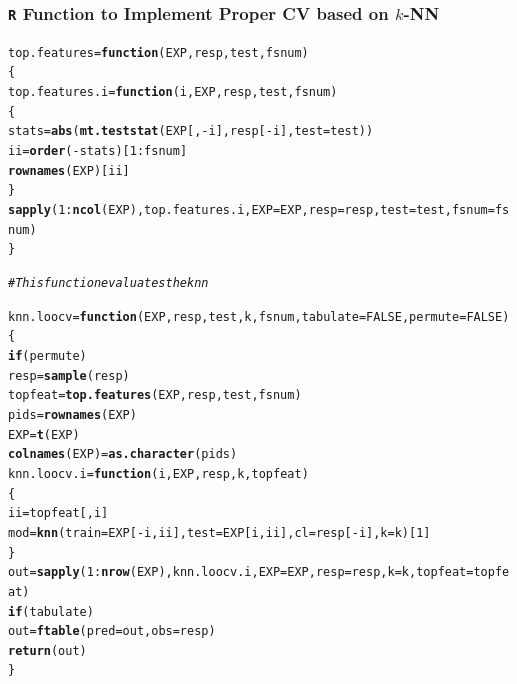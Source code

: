 \documentclass[xcolor=x11names,compress]{beamer}\usepackage[]{graphicx}\usepackage[]{color}
\makeatletter
\newcommand{\hlnum}[1]{\textcolor[rgb]{0.686,0.059,0.569}{#1}}%
\newcommand{\hlcom}[1]{\textcolor[rgb]{0.678,0.584,0.686}{\textit{#1}}}%
\newcommand{\hlopt}[1]{\textcolor[rgb]{0,0,0}{#1}}%
\newcommand{\hlstd}[1]{\textcolor[rgb]{0.345,0.345,0.345}{#1}}%
\newcommand{\hlkwa}[1]{\textcolor[rgb]{0.161,0.373,0.58}{\textbf{#1}}}%
\newcommand{\hlkwb}[1]{\textcolor[rgb]{0.69,0.353,0.396}{#1}}%
\newcommand{\hlkwc}[1]{\textcolor[rgb]{0.333,0.667,0.333}{#1}}%
\newcommand{\hlkwd}[1]{\textcolor[rgb]{0.737,0.353,0.396}{\textbf{#1}}}%
\newenvironment{kframe}{%
 \def\at@end@of@kframe{}%
 \ifinner\ifhmode%
  \def\at@end@of@kframe{\end{minipage}}%
  \begin{minipage}{\columnwidth}%
 \fi\fi%
 \def\FrameCommand##1{\hskip\@totalleftmargin \hskip-\fboxsep
 \colorbox{shadecolor}{##1}\hskip-\fboxsep
     \hskip-\linewidth \hskip-\@totalleftmargin \hskip\columnwidth}%
 \MakeFramed {\advance\hsize-\width
   \@totalleftmargin\z@ \linewidth\hsize
   \@setminipage}}%
 {\par\unskip\endMakeFramed%
 \at@end@of@kframe}
\newenvironment{knitrout}{}{} %
\makeatother
\begin{document}
\begin{frame}[containsverbatim]
  \frametitle{{\tt R} Function to Implement Proper CV based on $k$-NN}
\tiny
\begin{knitrout}\tiny
{}\color{fgcolor}\begin{kframe}
\begin{alltt}
\hlstd{top.features}\hlkwb{=}\hlkwa{function}\hlstd{(}\hlkwc{EXP}\hlstd{,}\hlkwc{resp}\hlstd{,}\hlkwc{test}\hlstd{,}\hlkwc{fsnum}\hlstd{)}
  \hlstd{\{}
    \hlstd{top.features.i}\hlkwb{=}\hlkwa{function}\hlstd{(}\hlkwc{i}\hlstd{,}\hlkwc{EXP}\hlstd{,}\hlkwc{resp}\hlstd{,}\hlkwc{test}\hlstd{,}\hlkwc{fsnum}\hlstd{)}
      \hlstd{\{}
        \hlstd{stats}\hlkwb{=}\hlkwd{abs}\hlstd{(}\hlkwd{mt.teststat}\hlstd{(EXP[,}\hlopt{-}\hlstd{i],resp[}\hlopt{-}\hlstd{i],}\hlkwc{test}\hlstd{=test))}
        \hlstd{ii}\hlkwb{=}\hlkwd{order}\hlstd{(}\hlopt{-}\hlstd{stats)[}\hlnum{1}\hlopt{:}\hlstd{fsnum]}
        \hlkwd{rownames}\hlstd{(EXP)[ii]}
      \hlstd{\}}
    \hlkwd{sapply}\hlstd{(}\hlnum{1}\hlopt{:}\hlkwd{ncol}\hlstd{(EXP),top.features.i,}\hlkwc{EXP}\hlstd{=EXP,}\hlkwc{resp}\hlstd{=resp,}\hlkwc{test}\hlstd{=test,}\hlkwc{fsnum}\hlstd{=fsnum)}
  \hlstd{\}}


\hlcom{# This function evaluates the knn}

\hlstd{knn.loocv}\hlkwb{=}\hlkwa{function}\hlstd{(}\hlkwc{EXP}\hlstd{,}\hlkwc{resp}\hlstd{,}\hlkwc{test}\hlstd{,}\hlkwc{k}\hlstd{,}\hlkwc{fsnum}\hlstd{,}\hlkwc{tabulate}\hlstd{=}\hlnum{FALSE}\hlstd{,}\hlkwc{permute}\hlstd{=}\hlnum{FALSE}\hlstd{)}
  \hlstd{\{}
    \hlkwa{if}\hlstd{(permute)}
      \hlstd{resp}\hlkwb{=}\hlkwd{sample}\hlstd{(resp)}
    \hlstd{topfeat}\hlkwb{=}\hlkwd{top.features}\hlstd{(EXP,resp,test,fsnum)}
    \hlstd{pids}\hlkwb{=}\hlkwd{rownames}\hlstd{(EXP)}
    \hlstd{EXP}\hlkwb{=}\hlkwd{t}\hlstd{(EXP)}
    \hlkwd{colnames}\hlstd{(EXP)}\hlkwb{=}\hlkwd{as.character}\hlstd{(pids)}
    \hlstd{knn.loocv.i}\hlkwb{=}\hlkwa{function}\hlstd{(}\hlkwc{i}\hlstd{,}\hlkwc{EXP}\hlstd{,}\hlkwc{resp}\hlstd{,}\hlkwc{k}\hlstd{,}\hlkwc{topfeat}\hlstd{)}
      \hlstd{\{}
        \hlstd{ii}\hlkwb{=}\hlstd{topfeat[,i]}
        \hlstd{mod}\hlkwb{=}\hlkwd{knn}\hlstd{(}\hlkwc{train}\hlstd{=EXP[}\hlopt{-}\hlstd{i,ii],}\hlkwc{test}\hlstd{=EXP[i,ii],}\hlkwc{cl}\hlstd{=resp[}\hlopt{-}\hlstd{i],}\hlkwc{k}\hlstd{=k)[}\hlnum{1}\hlstd{]}
      \hlstd{\}}
    \hlstd{out}\hlkwb{=}\hlkwd{sapply}\hlstd{(}\hlnum{1}\hlopt{:}\hlkwd{nrow}\hlstd{(EXP),knn.loocv.i,}\hlkwc{EXP}\hlstd{=EXP,}\hlkwc{resp}\hlstd{=resp,}\hlkwc{k}\hlstd{=k,}\hlkwc{topfeat}\hlstd{=topfeat)}
    \hlkwa{if}\hlstd{(tabulate)}
      \hlstd{out}\hlkwb{=}\hlkwd{ftable}\hlstd{(}\hlkwc{pred}\hlstd{=out,}\hlkwc{obs}\hlstd{=resp)}
    \hlkwd{return}\hlstd{(out)}
  \hlstd{\}}
\end{alltt}
\end{kframe}
\end{knitrout}
\end{frame}
\end{document}
